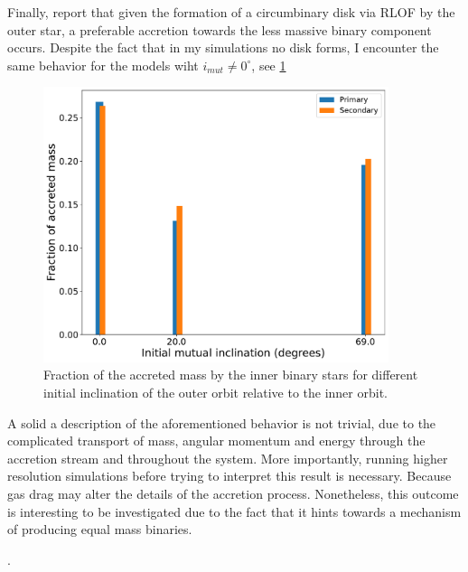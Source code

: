 Finally, \cite{zwart2019triple,leigh2020mergers} report that given the formation of a circumbinary disk via RLOF by the outer star, a preferable accretion towards the less massive binary component occurs. Despite the fact that in my simulations no disk forms, I encounter the same behavior for the models wiht $i_{mut} \neq 0^{\circ}$, see \cref{fig:inclination_binary_eff}
\begin{figure}[H]
    \centering
    \includegraphics[width=0.9\textwidth]{Thesis/graphs/inclination_case/incliantion_binary_acc_efficiency.pdf}
    \caption{Fraction of the accreted mass by the inner binary stars for different initial inclination of the outer orbit relative to the inner orbit.}
    \label{fig:inclination_binary_eff}
\end{figure}
A solid a description of the aforementioned behavior is not trivial, due to the complicated transport of mass, angular momentum and energy through the accretion stream and throughout the system. More importantly, running higher resolution simulations before trying to interpret this result is necessary. Because gas drag may alter the details of the accretion process. Nonetheless, this outcome is interesting to be investigated due to the fact that it hints towards a mechanism of producing equal mass binaries. 



.